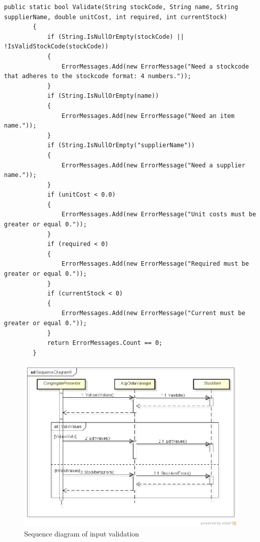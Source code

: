 \begin{lstlisting}[caption=Validate method of StockItem]
public static bool Validate(String stockCode, String name, String supplierName, double unitCost, int required, int currentStock)
        {
            if (String.IsNullOrEmpty(stockCode) || !IsValidStockCode(stockCode))
            {
                ErrorMessages.Add(new ErrorMessage("Need a stockcode that adheres to the stockcode format: 4 numbers."));
            }
            if (String.IsNullOrEmpty(name))
            {
                ErrorMessages.Add(new ErrorMessage("Need an item name."));
            }
            if (String.IsNullOrEmpty("supplierName"))
            {
                ErrorMessages.Add(new ErrorMessage("Need a supplier name."));
            }
            if (unitCost < 0.0)
            {
                ErrorMessages.Add(new ErrorMessage("Unit costs must be greater or equal 0."));
            }
            if (required < 0)
            {
                ErrorMessages.Add(new ErrorMessage("Required must be greater or equal 0."));
            }
            if (currentStock < 0)
            {
                ErrorMessages.Add(new ErrorMessage("Current must be greater or equal 0."));
            }
            return ErrorMessages.Count == 0;
        }
\end{lstlisting}

\begin{figure}[H]
\begin{center}
\includegraphics[width=\textwidth]{gfx/error_handling.png}
\caption{Sequence diagram of input validation}
\label{fig:error_handling}
\end{center}
\end{figure}